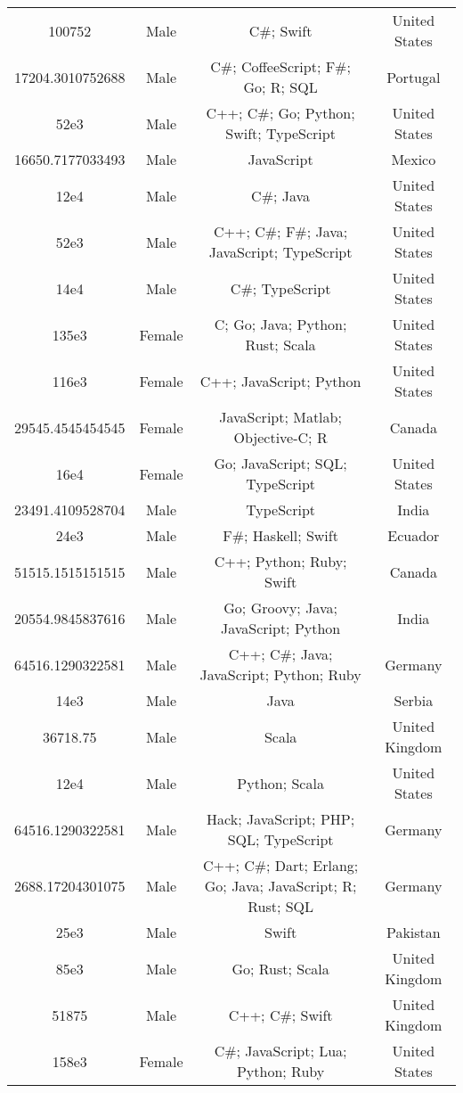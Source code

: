 \begin{center}
\begin{tabular}{ |c|c|c|c| }
100752  &  Male  &  C\#; Swift  &  United States  \\ 
17204.3010752688  &  Male  &  C\#; CoffeeScript; F\#; Go; R; SQL  &  Portugal  \\ 
52e3  &  Male  &  C++; C\#; Go; Python; Swift; TypeScript  &  United States  \\ 
16650.7177033493  &  Male  &  JavaScript  &  Mexico  \\ 
12e4  &  Male  &  C\#; Java  &  United States  \\ 
52e3  &  Male  &  C++; C\#; F\#; Java; JavaScript; TypeScript  &  United States  \\ 
14e4  &  Male  &  C\#; TypeScript  &  United States  \\ 
135e3  &  Female  &  C; Go; Java; Python; Rust; Scala  &  United States  \\ 
116e3  &  Female  &  C++; JavaScript; Python  &  United States  \\ 
29545.4545454545  &  Female  &  JavaScript; Matlab; Objective-C; R  &  Canada  \\ 
16e4  &  Female  &  Go; JavaScript; SQL; TypeScript  &  United States  \\ 
23491.4109528704  &  Male  &  TypeScript  &  India  \\ 
24e3  &  Male  &  F\#; Haskell; Swift  &  Ecuador  \\ 
51515.1515151515  &  Male  &  C++; Python; Ruby; Swift  &  Canada  \\ 
20554.9845837616  &  Male  &  Go; Groovy; Java; JavaScript; Python  &  India  \\ 
64516.1290322581  &  Male  &  C++; C\#; Java; JavaScript; Python; Ruby  &  Germany  \\ 
14e3  &  Male  &  Java  &  Serbia  \\ 
36718.75  &  Male  &  Scala  &  United Kingdom  \\ 
12e4  &  Male  &  Python; Scala  &  United States  \\ 
64516.1290322581  &  Male  &  Hack; JavaScript; PHP; SQL; TypeScript  &  Germany  \\ 
2688.17204301075  &  Male  &  C++; C\#; Dart; Erlang; Go; Java; JavaScript; R; Rust; SQL  &  Germany  \\ 
25e3  &  Male  &  Swift  &  Pakistan  \\ 
85e3  &  Male  &  Go; Rust; Scala  &  United Kingdom  \\ 
51875  &  Male  &  C++; C\#; Swift  &  United Kingdom  \\ 
158e3  &  Female  &  C\#; JavaScript; Lua; Python; Ruby  &  United States  \\ 

\end{tabular}
\end{center}
